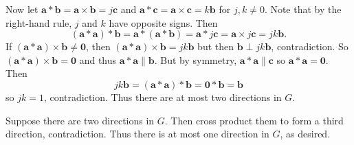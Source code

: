 Now let $\mathbf{a}*\mathbf{b}=\mathbf{a}\times\mathbf{b}=j\mathbf{c}$ and $\mathbf{a}*\mathbf{c}=\mathbf{a}\times\mathbf{c}=k\mathbf{b}$ for $j,k\neq0$. Note that by the right-hand rule, $j$ and $k$ have opposite signs. Then
\[
	(\mathbf{a}*\mathbf{a})*\mathbf{b}=\mathbf{a}*(\mathbf{a}*\mathbf{b})=\mathbf{a}*j\mathbf{c}=\mathbf{a}\times j\mathbf{c}=jk\mathbf{b}.
\]
If $(\mathbf{a}*\mathbf{a})\times\mathbf{b}\neq\mathbf{0}$, then $(\mathbf{a}*\mathbf{a})\times\mathbf{b}=jk\mathbf{b}$ but then $\mathbf{b}\perp jk\mathbf{b}$, contradiction. So $(\mathbf{a}*\mathbf{a})\times\mathbf{b}=\mathbf{0}$ and thus $\mathbf{a}*\mathbf{a}\parallel\mathbf{b}$. But by symmetry, $\mathbf{a}*\mathbf{a}\parallel\mathbf{c}$ so $\mathbf{a}*\mathbf{a}=\mathbf{0}$. Then
\[
	jk\mathbf{b}=(\mathbf{a}*\mathbf{a})*\mathbf{b}=\mathbf{0}*\mathbf{b}=\mathbf{b}
\]
so $jk=1$, contradiction. Thus there are at most two directions in $G$.

Suppose there are two directions in $G$. Then cross product them to form a third direction, contradiction. Thus there is at most one direction in $G$, as desired.